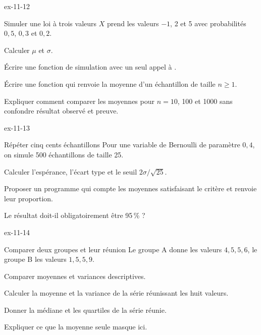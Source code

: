 \clearpage
{}
\begin{blocLivre}{ex-11-12}
\begin{exercice}[3]{Simuler une loi à trois valeurs}
$X$ prend les valeurs $-1$, 2 et 5 avec probabilités $0{,}5$, $0{,}3$ et $0{,}2$.\begin{questions}
\item Calculer $\mu$ et $\sigma$.
\item Écrire une fonction de simulation avec un seul appel à .
\item Écrire une fonction qui renvoie la moyenne d’un échantillon de taille $n\geq1$.
\item Expliquer comment comparer les moyennes pour $n=10$, 100 et 1000 sans confondre résultat observé et preuve.
\end{questions}
\end{exercice}
\end{blocLivre}
\begin{blocLivre}{ex-11-13}
\begin{exercice}[3]{Répéter cinq cents échantillons}
Pour une variable de Bernoulli de paramètre $0{,}4$, on simule 500 échantillons de taille 25.\begin{questions}
\item Calculer l’espérance, l’écart type et le seuil $2\sigma/\sqrt{25}$.
\item Proposer un programme qui compte les moyennes satisfaisant le critère et renvoie leur proportion.
\item Le résultat doit-il obligatoirement être 95\,\% ?
\end{questions}
\end{exercice}
\end{blocLivre}
\begin{blocLivre}{ex-11-14}
\begin{exercice}[3]{Comparer deux groupes et leur réunion}
Le groupe A donne les valeurs $4,5,5,6$, le groupe B les valeurs $1,5,5,9$.\begin{questions}
\item Comparer moyennes et variances descriptives.
\item Calculer la moyenne et la variance de la série réunissant les huit valeurs.
\item Donner la médiane et les quartiles de la série réunie.
\item Expliquer ce que la moyenne seule masque ici.
\end{questions}
\end{exercice}
\end{blocLivre}
